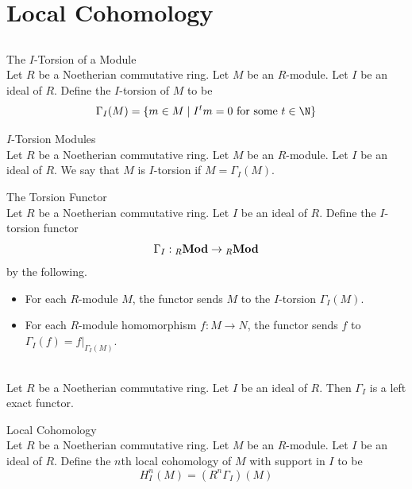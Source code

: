 \documentclass[a4paper]{article}
\begin{document}
\pagebreak
\section{Local Cohomology}
\subsection{}
\begin{defn}{The $I$-Torsion of a Module}{}\\
Let $R$ be a Noetherian commutative ring. Let $M$ be an $R$-module. Let $I$ be an ideal of $R$. Define the $I$-torsion of $M$ to be $$\Gamma_I(M)=\{m\in M\;|\;I^tm=0\text{ for some }t\in\N\}$$
\end{defn}

\begin{defn}{$I$-Torsion Modules}{}\\
Let $R$ be a Noetherian commutative ring. Let $M$ be an $R$-module. Let $I$ be an ideal of $R$. We say that $M$ is $I$-torsion if $M=\Gamma_I(M)$. 
\end{defn}

\begin{defn}{The Torsion Functor}{}\\
Let $R$ be a Noetherian commutative ring. Let $I$ be an ideal of $R$. Define the $I$-torsion functor $$\Gamma_I:{_R}\bold{Mod}\to{_R}\bold{Mod}$$ by the following. 
\begin{itemize}
\item For each $R$-module $M$, the functor sends $M$ to the $I$-torsion $\Gamma_I(M)$. 
\item For each $R$-module homomorphism $f:M\to N$, the functor sends $f$ to $\Gamma_I(f)=f|_{\Gamma_I(M)}$. 
\end{itemize}
\end{defn}

\begin{lmm}{}{}\\
Let $R$ be a Noetherian commutative ring. Let $I$ be an ideal of $R$. Then $\Gamma_I$ is a left exact functor. 
\end{lmm}

\begin{defn}{Local Cohomology}{}\\
Let $R$ be a Noetherian commutative ring. Let $M$ be an $R$-module. Let $I$ be an ideal of $R$. Define the $n$th local cohomology of $M$ with support in $I$ to be $$H_I^n(M)=(R^n\Gamma_I)(M)$$
\end{defn}
\end{document}
